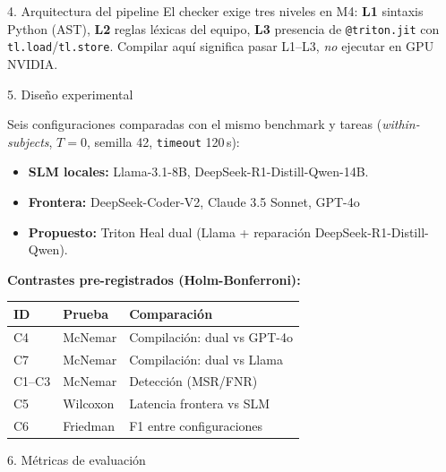 \documentclass[final]{beamer}
\newlength{\colwidth}
\begin{document}
\begin{frame}[t]
\begin{columns}[t]
\begin{column}{\colwidth}
\begin{block}{4. Arquitectura del pipeline}
    El checker exige tres niveles en M4: \textbf{L1} sintaxis Python (AST),
    \textbf{L2} reglas léxicas del equipo, \textbf{L3} presencia de
    \texttt{@triton.jit} con \texttt{tl.load}/\texttt{tl.store}. Compilar aquí
    significa pasar L1--L3, \emph{no} ejecutar en GPU NVIDIA.

  \end{block}

  \begin{block}{5. Diseño experimental}

    Seis configuraciones comparadas con el mismo benchmark y tareas
    (\emph{within-subjects}, $T=0$, semilla 42, \texttt{timeout} 120\,s):

    \begin{itemize}
      \item \textbf{SLM locales:} Llama-3.1-8B, DeepSeek-R1-Distill-Qwen-14B.
      \item \textbf{Frontera:} DeepSeek-Coder-V2, Claude 3.5 Sonnet, GPT-4o
      
      \item \textbf{Propuesto:} Triton Heal dual (Llama + reparación DeepSeek-R1-Distill-Qwen).
    \end{itemize}

    \vspace{0.4em}
    \noindent\textbf{Contrastes pre-registrados (Holm-Bonferroni):}
    {\small
    \begin{table}
      \centering
      \begin{tabular}{l l l}
        \toprule
        \textbf{ID} & \textbf{Prueba} & \textbf{Comparación} \\
        \midrule
        C4 & McNemar  & Compilación: dual vs GPT-4o \\
        C7 & McNemar  & Compilación: dual vs Llama \\
        C1--C3 & McNemar & Detección (MSR/FNR) \\
        C5 & Wilcoxon & Latencia frontera vs SLM \\
        C6 & Friedman & F1 entre configuraciones \\
        \bottomrule
      \end{tabular}
    \end{table}}

  \end{block}

  \begin{block}{6. Métricas de evaluación}


\end{block}
\end{column}
\end{columns}
\end{frame}
\end{document}
